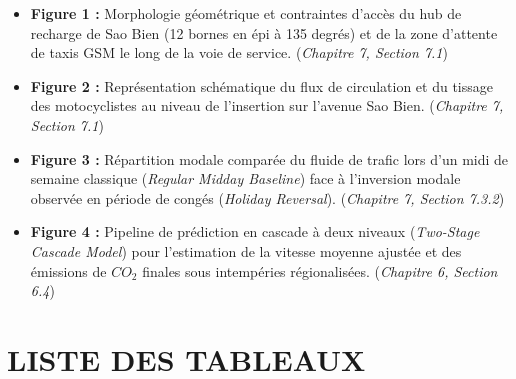 \documentclass[10pt, a4paper]{article}
\providecommand{\tightlist}{}
\begin{document}
\begin{itemize}
\tightlist
\item
  \textbf{Figure 1 :} Morphologie géométrique et contraintes d'accès du
  hub de recharge de Sao Bien (12 bornes en épi à 135 degrés) et de la
  zone d'attente de taxis GSM le long de la voie de service.
  (\emph{Chapitre 7, Section 7.1})
\item
  \textbf{Figure 2 :} Représentation schématique du flux de circulation
  et du tissage des motocyclistes au niveau de l'insertion sur l'avenue
  Sao Bien. (\emph{Chapitre 7, Section 7.1})
\item
  \textbf{Figure 3 :} Répartition modale comparée du fluide de trafic
  lors d'un midi de semaine classique (\emph{Regular Midday Baseline})
  face à l'inversion modale observée en période de congés (\emph{Holiday
  Reversal}). (\emph{Chapitre 7, Section 7.3.2})
\item
  \textbf{Figure 4 :} Pipeline de prédiction en cascade à deux niveaux
  (\emph{Two-Stage Cascade Model}) pour l'estimation de la vitesse
  moyenne ajustée et des émissions de \(CO_2\) finales sous intempéries
  régionalisées. (\emph{Chapitre 6, Section 6.4})
\end{itemize}

\newpage

\section{LISTE DES TABLEAUX}\label{liste-des-tableaux}
\end{document}
